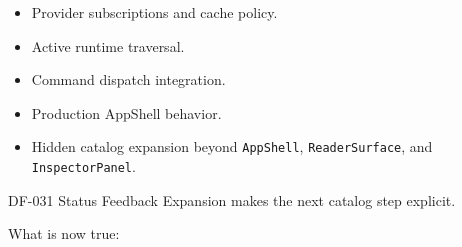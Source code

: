 \begin{itemize}
\tightlist
\item
  Provider subscriptions and cache policy.
\item
  Active runtime traversal.
\item
  Command dispatch integration.
\item
  Production AppShell behavior.
\item
  Hidden catalog expansion beyond \texttt{A\allowbreak{}p\allowbreak{}p\allowbreak{}S\allowbreak{}h\allowbreak{}e\allowbreak{}l\allowbreak{}l}, \texttt{R\allowbreak{}e\allowbreak{}a\allowbreak{}d\allowbreak{}e\allowbreak{}r\allowbreak{}S\allowbreak{}u\allowbreak{}r\allowbreak{}f\allowbreak{}a\allowbreak{}c\allowbreak{}e}, and \texttt{I\allowbreak{}n\allowbreak{}s\allowbreak{}p\allowbreak{}e\allowbreak{}c\allowbreak{}t\allowbreak{}o\allowbreak{}r\allowbreak{}P\allowbreak{}a\allowbreak{}n\allowbreak{}e\allowbreak{}l}.
\end{itemize}

DF-031 Status Feedback Expansion makes the next catalog step explicit.

What is now true:

